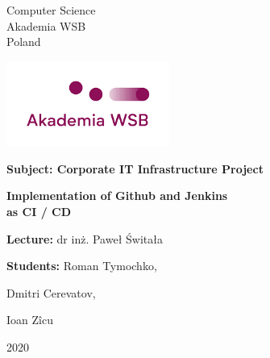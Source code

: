 \documentclass[12pt,a4paper,twoside]{article}
\begin{document}
\fontsize{14pt}{14pt}\selectfont
\begin{titlepage}
 \begin{center}
       Computer Science\\
       Akademia WSB\\
       Poland\\

      \vspace*{2cm}

      \includegraphics[width=0.4\textwidth]{images-aws/university}

       \vspace*{3cm}
      
       \textbf{Subject: Corporate IT Infrastructure Project}
 
       \begin{center}
	\Large\textbf{Implementation of Github and Jenkins \\ as CI / CD}\\
       \end{center}

       \vspace{0.5cm}
        
            
       \vspace{1.5cm}


       \mbox{}\hfill \textbf{Lecture:}  dr inż. Paweł Świtała

       {\raggedleft \textbf{Students:} Roman Tymochko, \par}
       {\raggedleft Dmitri Cerevatov,       \par}
       {\raggedleft Ioan Zîcu                    \par}


       \vfill
            

       \vspace{2cm}
     
       2020
            
   \end{center}
\end{titlepage}

\newpage

\fontsize{12pt}{12pt}\selectfont


\tableofcontents
\end{document}
